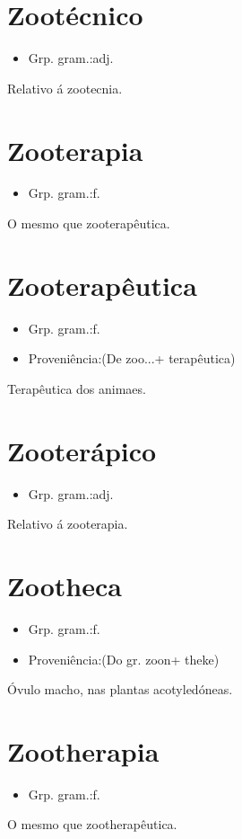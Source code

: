 \section{Zootécnico}
\begin{itemize}
\item {Grp. gram.:adj.}
\end{itemize}
Relativo á zootecnia.
\section{Zooterapia}
\begin{itemize}
\item {Grp. gram.:f.}
\end{itemize}
O mesmo que \textunderscore zooterapêutica\textunderscore .
\section{Zooterapêutica}
\begin{itemize}
\item {Grp. gram.:f.}
\end{itemize}
\begin{itemize}
\item {Proveniência:(De \textunderscore zoo...\textunderscore  + \textunderscore terapêutica\textunderscore )}
\end{itemize}
Terapêutica dos animaes.
\section{Zooterápico}
\begin{itemize}
\item {Grp. gram.:adj.}
\end{itemize}
Relativo á zooterapia.
\section{Zootheca}
\begin{itemize}
\item {Grp. gram.:f.}
\end{itemize}
\begin{itemize}
\item {Proveniência:(Do gr. \textunderscore zoon\textunderscore  + \textunderscore theke\textunderscore )}
\end{itemize}
Óvulo macho, nas plantas acotyledóneas.
\section{Zootherapia}
\begin{itemize}
\item {Grp. gram.:f.}
\end{itemize}
O mesmo que \textunderscore zootherapêutica\textunderscore .
